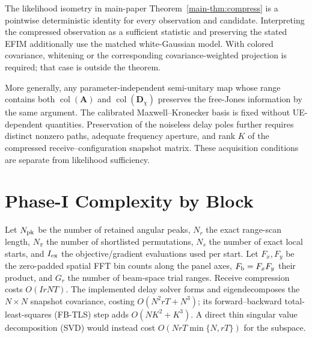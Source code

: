 \documentclass[journal,letterpaper]{IEEEtran}
\newcommand{\bA}{\mathbf{A}}
\newcommand{\bD}{\mathbf{D}}
\newcommand{\coll}{\operatorname{col}}
\begin{document}
The likelihood isometry in main-paper Theorem~\ref{main-thm:compress} is a
pointwise deterministic identity for every observation and candidate.
Interpreting the compressed observation as a sufficient statistic and
preserving the stated EFIM additionally use the matched white-Gaussian model.
With colored covariance, whitening or the corresponding covariance-weighted
projection is required; that case is outside the theorem.

More generally, any parameter-independent semi-unitary map whose range
contains both $\coll(\bA)$ and $\coll(\bD_\chi)$ preserves the free-Jones
information by the same argument.  The calibrated Maxwell--Kronecker basis
is fixed without UE-dependent quantities.  Preservation of
the noiseless delay poles further requires distinct nonzero paths, adequate
frequency aperture, and rank $K$ of the compressed receive--configuration
snapshot matrix.  These acquisition conditions are separate from likelihood
sufficiency.

\section{Phase-I Complexity by Block}

Let $N_{\rm pk}$ be the number of retained angular peaks, $N_r$ the exact
range-scan length, $N_\pi$ the number of shortlisted permutations, $N_s$ the
number of exact local starts, and $I_{\rm ex}$ the objective/gradient
evaluations used per start. Let $F_x,F_y$ be the zero-padded spatial FFT bin
counts along the panel axes, $F_{\rm b}=F_xF_y$ their product, and $G_r$ the
number of beam-space trial ranges.
Receive compression costs $O(IrNT)$.  The implemented delay solver forms and
eigendecomposes the $N\times N$ snapshot covariance, costing
$O(N^2rT+N^3)$; its forward--backward total-least-squares (FB-TLS) step
adds $O(NK^2+K^3)$.  A direct thin singular value decomposition (SVD)
would instead cost $O(NrT\min\{N,rT\})$ for the subspace.
\end{document}
